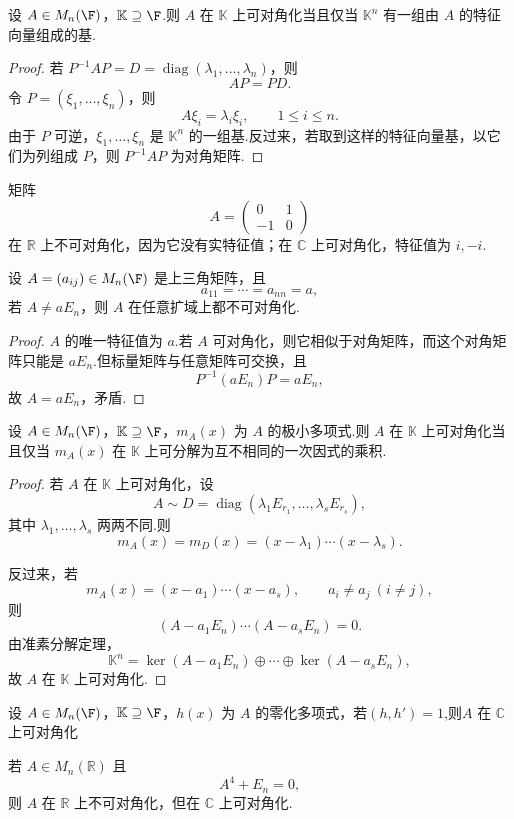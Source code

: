 \begin{proposition}
	设 $A\in M_n(\F)$，$\mathbb K\supseteq\F$.则 $A$ 在 $\mathbb K$ 上可对角化当且仅当 $\mathbb K^n$ 有一组由 $A$ 的特征向量组成的基.
\end{proposition}

\begin{proof}
	若 $P^{-1}AP=D=\operatorname{diag}(\lambda_1,\ldots,\lambda_n)$，则
	\[
	AP=PD.
	\]
	令 $P=(\xi_1,
	\ldots,\xi_n)$，则
	\[
	A\xi_i=\lambda_i\xi_i,
	\qquad 1\leq i\leq n.
	\]
	由于 $P$ 可逆，$\xi_1,\ldots,\xi_n$ 是 $\mathbb K^n$ 的一组基.反过来，若取到这样的特征向量基，以它们为列组成 $P$，则 $P^{-1}AP$ 为对角矩阵.
\end{proof}

\begin{example}
	矩阵
	\[
	A=\begin{pmatrix}0&1\\-1&0\end{pmatrix}
	\]
	在 $\mathbb R$ 上不可对角化，因为它没有实特征值；在 $\mathbb C$ 上可对角化，特征值为 $i,-i$.
\end{example}

\begin{example}
	设 $A=(a_{ij})\in M_n(\F)$ 是上三角矩阵，且
	\[
	a_{11}=\cdots=a_{nn}=a,
	\]
	若 $A\neq aE_n$，则 $A$ 在任意扩域上都不可对角化.
\end{example}

\begin{proof}
	$A$ 的唯一特征值为 $a$.若 $A$ 可对角化，则它相似于对角矩阵，而这个对角矩阵只能是 $aE_n$.但标量矩阵与任意矩阵可交换，且
	\[
	P^{-1}(aE_n)P=aE_n,
	\]
	故 $A=aE_n$，矛盾.
\end{proof}

\begin{theorem}
	设 $A\in M_n(\F)$，$\mathbb K\supseteq\F$，$m_A(x)$ 为 $A$ 的极小多项式.则 $A$ 在 $\mathbb K$ 上可对角化当且仅当 $m_A(x)$ 在 $\mathbb K$ 上可分解为互不相同的一次因式的乘积.
\end{theorem}

\begin{proof}
	若 $A$ 在 $\mathbb K$ 上可对角化，设
	\[
	A\sim D=\operatorname{diag}(\lambda_1E_{r_1},\ldots,\lambda_sE_{r_s}),
	\]
	其中 $\lambda_1,
	\ldots,\lambda_s$ 两两不同.则
	\[
	m_A(x)=m_D(x)=(x-\lambda_1)\cdots(x-\lambda_s).
	\]
	
	反过来，若
	\[
	m_A(x)=(x-a_1)\cdots(x-a_s),
	\qquad a_i\neq a_j\ (i\neq j),
	\]
	则
	\[
	(A-a_1E_n)\cdots(A-a_sE_n)=0.
	\]
	由准素分解定理，
	\[
	\mathbb K^n=\ker(A-a_1E_n)\oplus\cdots\oplus\ker(A-a_sE_n),
	\]
	故 $A$ 在 $\mathbb K$ 上可对角化.
\end{proof}
\begin{corollary}
	设 $A\in M_n(\F)$，$\mathbb K\supseteq\F$，$h(x)$ 为 $A$ 的零化多项式，若$(h,h')=1$,则$A$ 在 $\mathbb C$ 上可对角化
\end{corollary}
\begin{example}
	若 $A\in M_n(\mathbb R)$ 且
	\[
	A^4+E_n=0,
	\]
	则 $A$ 在 $\mathbb R$ 上不可对角化，但在 $\mathbb C$ 上可对角化.
\end{example}

